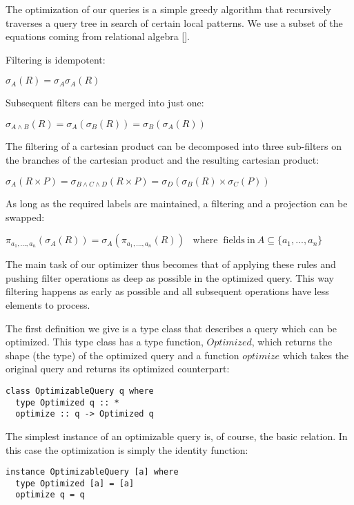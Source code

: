 
The optimization of our queries is a simple greedy algorithm that recursively traverses a query tree in search of certain local patterns. We use a subset of the equations coming from relational algebra [].

Filtering is idempotent:

$\sigma_{A}(R)=\sigma_{A}\sigma_{A}(R)\,\!$

Subsequent filters can be merged into just one:

$\sigma_{A \land B}(R)=\sigma_{A}(\sigma_{B}(R))=\sigma_{B}(\sigma_{A}(R))$

The filtering of a cartesian product can be decomposed into three sub-filters on the branches of the cartesian product and the resulting cartesian product:

$\sigma_{A}(R \times P) = \sigma_{B \wedge C \wedge D}(R \times P) = \sigma_{D}(\sigma_{B}(R) \times \sigma_{C}(P))$

As long as the required labels are maintained, a filtering and a projection can be swapped:

$\pi_{a_1, ...,a_n}(\sigma_A( R )) = \sigma_A(\pi_{a_1, ...,a_n}( R ))\;\;\;\mathrm{where}\;\;\mathrm{fields\ in}\ A \subseteq \{a_1,...,a_n\}$


The main task of our optimizer thus becomes that of applying these rules and pushing filter operations as deep as possible in the optimized query. This way filtering happens as early as possible and all subsequent operations have less elements to process.

The first definition we give is a type class that describes a query which can be optimized. This type class has a type function, $Optimized$, which returns the shape (the type) of the optimized query and a function $optimize$ which takes the original query and returns its optimized counterpart:
\begin{lstlisting}
class OptimizableQuery q where
  type Optimized q :: *
  optimize :: q -> Optimized q
\end{lstlisting}


The simplest instance of an optimizable query is, of course, the basic relation. In this case the optimization is simply the identity function:
\begin{lstlisting}
instance OptimizableQuery [a] where
  type Optimized [a] = [a]
  optimize q = q
\end{lstlisting}



